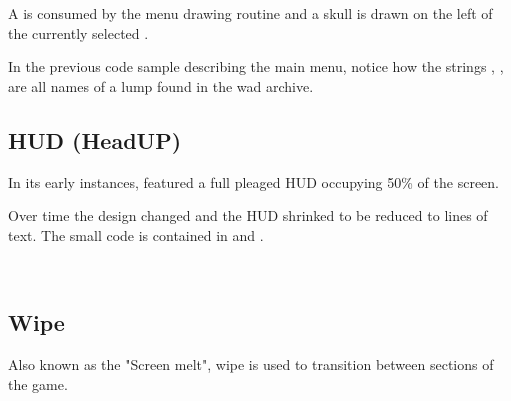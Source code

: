 
\par
A  is consumed by the menu drawing routine and a skull is drawn on the left of the currently selected .\\
\par
\begin{minipage}{0.55\textwidth}
\end{minipage}
\begin{minipage}{0.45\textwidth}
\centering
{}
\end{minipage}
\par
{}
\par
In the previous code sample describing the main menu, notice how the strings , ,  are all names of a lump found in the wad archive.\\
\par








\subsection{HUD (HeadUP)}
In its early instances, \doom featured a full pleaged HUD occupying 50\% of the screen.\\
\par
{}
\par
Over time the design changed and the HUD shrinked to be reduced to lines of text. The small code is contained in  and .\\
\par
{}\\
\par








\subsection{Wipe}
\label{label_melt}
Also known as the "Screen melt", wipe is used to transition between sections of the game.

